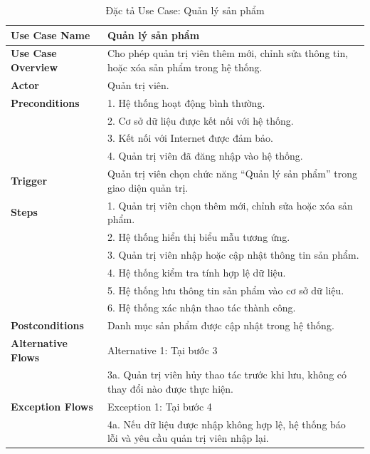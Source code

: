 {\begin{longtable}{|>{\bfseries}p{4cm}|p{11.5cm}|}
\caption{Đặc tả Use Case: Quản lý sản phẩm}
\label{tab:uc-admin-product-management} \\
\hline
\textbf{Use Case Name} & Quản lý sản phẩm \\
\hline
\textbf{Use Case Overview} & Cho phép quản trị viên thêm mới, chỉnh sửa thông tin, hoặc xóa sản phẩm trong hệ thống. \\
\hline
\textbf{Actor} & Quản trị viên. \\
\hline
\textbf{Preconditions} & 1. Hệ thống hoạt động bình thường. \\
& 2. Cơ sở dữ liệu được kết nối với hệ thống. \\
& 3. Kết nối với Internet được đảm bảo. \\
& 4. Quản trị viên đã đăng nhập vào hệ thống. \\
\hline
\textbf{Trigger} & Quản trị viên chọn chức năng “Quản lý sản phẩm” trong giao diện quản trị. \\
\hline
\textbf{Steps} & 1. Quản trị viên chọn thêm mới, chỉnh sửa hoặc xóa sản phẩm. \\
& 2. Hệ thống hiển thị biểu mẫu tương ứng. \\
& 3. Quản trị viên nhập hoặc cập nhật thông tin sản phẩm. \\
& 4. Hệ thống kiểm tra tính hợp lệ dữ liệu. \\
& 5. Hệ thống lưu thông tin sản phẩm vào cơ sở dữ liệu. \\
& 6. Hệ thống xác nhận thao tác thành công. \\
\hline
\textbf{Postconditions} & Danh mục sản phẩm được cập nhật trong hệ thống. \\
\hline
\textbf{Alternative Flows} & Alternative 1: Tại bước 3 \\
& 3a. Quản trị viên hủy thao tác trước khi lưu, không có thay đổi nào được thực hiện. \\
\hline
\textbf{Exception Flows} & Exception 1: Tại bước 4 \\
& 4a. Nếu dữ liệu được nhập không hợp lệ, hệ thống báo lỗi và yêu cầu quản trị viên nhập lại. \\
\hline
\end{longtable}

}
